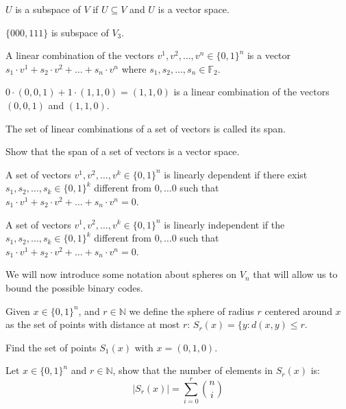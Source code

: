 \begin{definition}
$U$ is a subspace of $V$ if $U\subseteq V$ and $U$ is a vector space.
\end{definition}
\begin{example}
$\{000,111\}$ is subspace of $V_3$.
\end{example}
\begin{definition}
A linear combination of the vectors $v^1,v^2,\ldots,v^n\in \{0,1\}^n$ is a vector $s_1\cdot v^1+s_2\cdot v^2+\ldots+s_n\cdot v^n$ where $s_1,s_2,\ldots,s_n\in\mathbb F_2$.
\end{definition}
\begin{example}
$0\cdot(0,0,1)+1\cdot(1,1,0)=(1,1,0)$ is a linear combination of the vectors $(0,0,1)$ and $(1,1,0)$.
\end{example}
\begin{definition}
The set of linear combinations of a set of vectors is called its span.
\end{definition}
\begin{exercise}
Show that the span of a set of vectors is a vector space.
\end{exercise}
\begin{definition}
A set of vectors $v^1,v^2,\ldots,v^k\in \{0,1\}^n$ is linearly dependent if there exist $s_1,s_2,\ldots,s_k\in\{0,1\}^k$ different from $0,\ldots 0$ such that $s_1\cdot v^1+s_2\cdot v^2+\ldots+s_n\cdot v^n=0$.
\end{definition}
\begin{definition}
A set of vectors $v^1,v^2,\ldots,v^k\in \{0,1\}^n$ is linearly independent if the  $s_1,s_2,\ldots,s_k\in\{0,1\}^k$ different from $0,\ldots 0$ such that $s_1\cdot v^1+s_2\cdot v^2+\ldots+s_n\cdot v^n=0$.
\end{definition}
We will now introduce some notation about spheres on $V_n$ that will allow us to bound the possible binary codes.
\begin{definition}
Given $x\in\{0,1\}^n$, and $r\in\mathbb N$ we define the sphere of radius $r$ centered around $x$ as the set of points with distance at most $r$: $S_r(x)=\{y:d(x,y)\leq r$.
\end{definition}
\begin{exercise}
Find the set of points $S_1(x)$ with $x=(0,1,0)$.
\end{exercise}
\begin{exercise}
\label{ex:sphere}
Let $x\in\{0,1\}^n$ and $r\in\mathbb N$, show that the number of elements in $S_r(x)$ is:
\begin{equation}
\left|S_r(x)\right|=\sum_{i=0}^r{n\choose i}
\end{equation}
\end{exercise}
